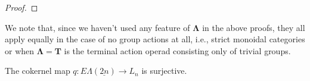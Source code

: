 \documentclass{amsbook} %
\newcommand{\mb}{\mathbf}
\newcommand{\ML}{\mathbf{\Lambda}}
\newcommand{\EL}{E\Lambda}
\newenvironment{eq*}{\begin{equation*}}{\end{equation*}}
\numberwithin{section}{chapter}
\begin{document}
\begin{proof}
\end{proof}

\begin{rem}\label{alsowithoutgroups}
We note that, since we haven't used any feature of $\ML$ in the above proofs, they all apply equally in the case of no group actions at all, i.e., strict monoidal categories or when $\ML = \mb{T}$ is the terminal action operad consisting only of trivial groups.
\end{rem}


\begin{cor}\label{qsurj} The cokernel map $q: \EL(\underline{2n}) \to L_n$ is surjective.
\end{cor}
\end{document}
